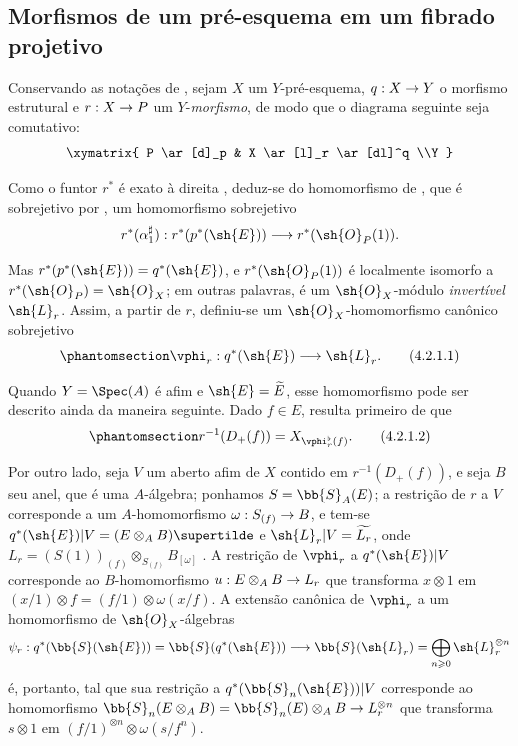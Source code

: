 \documentclass[oneside,10pt]{amsart}
\makeatletter
\renewcommand{\geq}{\geqslant}
\newcommand{\ega@arrow}[2]{\mathchoice{#1}{#2}{#2}{#2}}
\renewcommand{\to}{\ega@arrow{\longrightarrow}{\rightarrow}}
\newcommand{\oldpage}[2][]{\marginnote{\normalfont\footnotesize\textbf{#1}~|~#2}\ignorespaces}
\let\EGAOriginalLabel\label
\renewcommand{\label}[1]{\phantomsection\EGAOriginalLabel{#1}}
\makeatother
\begin{document}
\subsection{Morfismos de um pré-esquema em um fibrado projetivo}
\label{subsection:II.4.2}

\begin{env}[4.2.1]
\label{II.4.2.1}
Conservando as notações de , sejam $X$ um $Y$-pré-esquema, $q:X\to Y$ o morfismo estrutural e $r:X\to P$ um $Y$-\emph{morfismo}, de modo que o diagrama seguinte seja comutativo:
\[
  \xymatrix{
    P \ar[d]_p & X \ar[l]_r \ar[dl]^q
  \\Y
  }
\]
\oldpage[II]{73}

Como o funtor $r^*$ é exato à direita , deduz-se do homomorfismo de , que é sobrejetivo por , um homomorfismo sobrejetivo
\[
  r^*(\alpha_1^\sharp): r^*(p^*(\sh{E})) \to r^*(\sh{O}_P(1)).
\]

Mas $r^*(p^*(\sh{E}))=q^*(\sh{E})$, e $r^*(\sh{O}_P(1))$ é localmente isomorfo a $r^*(\sh{O}_P)=\sh{O}_X$; em outras palavras, é um $\sh{O}_X$-módulo \emph{invertível} $\sh{L}_r$.
Assim, a partir de $r$, definiu-se um $\sh{O}_X$-homomorfismo canônico sobrejetivo
\[
\label{II.4.2.1.1}
  \vphi_r:q^*(\sh{E}) \to \sh{L}_r.
  \tag{4.2.1.1}
\]

Quando $Y=\Spec(A)$ é afim e $\sh{E}=\widetilde{E}$, esse homomorfismo pode ser descrito ainda da maneira seguinte.
Dado $f\in E$, resulta primeiro de  que
\[
\label{II.4.2.1.2}
  r^{-1}(D_+(f)) = X_{\vphi_r^\flat(f)}.
  \tag{4.2.1.2}
\]

Por outro lado, seja $V$ um aberto afim de $X$ contido em $r^{-1}(D_+(f))$, e seja $B$ seu anel, que é uma $A$-álgebra;
ponhamos $S=\bb{S}_A(E)$;
a restrição de $r$ a $V$ corresponde a um $A$-homomorfismo $\omega:S_{(f)}\to B$, e tem-se $q^*(\sh{E})|V=(E\otimes_A B)\supertilde$ e $\sh{L}_r|V=\widetilde{L_r}$, onde $L_r=(S(1))_{(f)}\otimes_{S_{(f)}}B_{[\omega]}$ .
A restrição de $\vphi_r$ a $q^*(\sh{E})|V$ corresponde ao $B$-homomorfismo $u:E\otimes_A B\to L_r$ que transforma $x\otimes1$ em $(x/1)\otimes f=(f/1)\otimes\omega(x/f)$.
A extensão canônica de $\vphi_r$ a um homomorfismo de $\sh{O}_X$-álgebras
\[
  \psi_r: q^*(\bb{S}(\sh{E})) = \bb{S}(q^*(\sh{E})) \to \bb{S}(\sh{L}_r) = \bigoplus_{n\geq0}\sh{L}_r^{\otimes n}
\]
é, portanto, tal que sua restrição a $q^*(\bb{S}_n(\sh{E}))|V$ corresponde ao homomorfismo $\bb{S}_n(E\otimes_A B)=\bb{S}_n(E)\otimes_A B\to L_r^{\otimes n}$ que transforma $s\otimes1$ em $(f/1)^{\otimes n}\otimes\omega(s/f^n)$.
\end{env}
\end{document}
